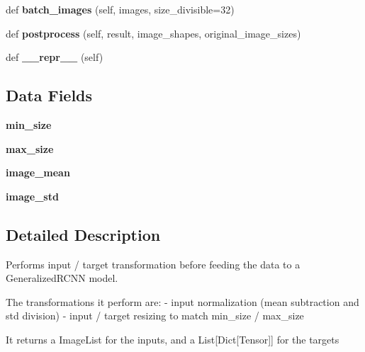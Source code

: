 \begin{DoxyCompactItemize}
def {\bfseries batch\+\_\+images} (self, images, size\+\_\+divisible=32)
\item 
\mbox{\label{classtorchvision_1_1models_1_1detection_1_1transform_1_1GeneralizedRCNNTransform_a55a47849a4331a11a228b72925aae5e1}} 
def {\bfseries postprocess} (self, result, image\+\_\+shapes, original\+\_\+image\+\_\+sizes)
\item 
\mbox{\label{classtorchvision_1_1models_1_1detection_1_1transform_1_1GeneralizedRCNNTransform_a47a42b9d3951f6fef9b670839a3db2fc}} 
def {\bfseries \+\_\+\+\_\+repr\+\_\+\+\_\+} (self)
\end{DoxyCompactItemize}
\subsection*{Data Fields}
\begin{DoxyCompactItemize}
\item 
\mbox{\label{classtorchvision_1_1models_1_1detection_1_1transform_1_1GeneralizedRCNNTransform_afea994c8a22e0b6b7e96885bb3d89714}} 
{\bfseries min\+\_\+size}
\item 
\mbox{\label{classtorchvision_1_1models_1_1detection_1_1transform_1_1GeneralizedRCNNTransform_af7e5f38d40985d000a25e191e2840969}} 
{\bfseries max\+\_\+size}
\item 
\mbox{\label{classtorchvision_1_1models_1_1detection_1_1transform_1_1GeneralizedRCNNTransform_ac204cc1f00e6d2406e84250c2d3f685c}} 
{\bfseries image\+\_\+mean}
\item 
\mbox{\label{classtorchvision_1_1models_1_1detection_1_1transform_1_1GeneralizedRCNNTransform_ab6f5e4e9a4f8c9d48abbf1f7dd68b08b}} 
{\bfseries image\+\_\+std}
\end{DoxyCompactItemize}


\subsection{Detailed Description}
\begin{DoxyVerb}Performs input / target transformation before feeding the data to a GeneralizedRCNN
model.

The transformations it perform are:
    - input normalization (mean subtraction and std division)
    - input / target resizing to match min_size / max_size

It returns a ImageList for the inputs, and a List[Dict[Tensor]] for the targets
\end{DoxyVerb}
 

